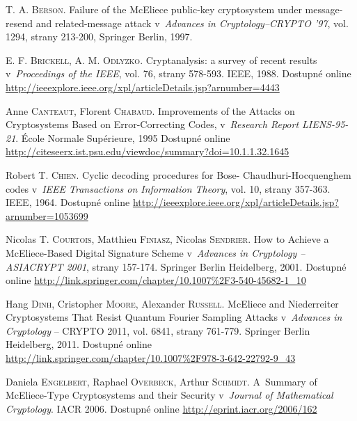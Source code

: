 \documentclass[thesis=M,czech,hidelinks]{FITthesis}[2012/06/26]
\newcommand{\0}{{\textcolor[gray]{0.75}{0}}}
\begin{document}
\begin{thebibliography}{99}
        T. A. \textsc{Berson}. Failure of the McEliece public-key cryptosystem under
        message-resend and related-message attack v~\emph{Advances in
        Cryptology–CRYPTO ’97}, vol. 1294, strany 213-200, Springer Berlin, 1997.

        E. F. \textsc{Brickell}, A. M. \textsc{Odlyzko}. Cryptanalysis: a survey
        of recent results v~\emph{Proceedings of the IEEE}, vol. 76, strany
        578-593. IEEE, 1988. Dostupné online
        \url{http://ieeexplore.ieee.org/xpl/articleDetails.jsp?arnumber=4443}

        Anne \textsc{Canteaut}, Florent \textsc{Chabaud}. Improvements of
        the Attacks on Cryptosystems Based on Error-Correcting Codes,
        v~\emph{Research Report LIENS-95-21}. École Normale Supérieure, 1995
        Dostupné online
        \url{http://citeseerx.ist.psu.edu/viewdoc/summary?doi=10.1.1.32.1645}

        Robert T. \textsc{Chien}. Cyclic decoding procedures for Bose-
        Chaudhuri-Hocquenghem codes v~\emph{IEEE Transactions on Information
        Theory}, vol. 10, strany 357-363. IEEE, 1964. Dostupné online
        \url{http://ieeexplore.ieee.org/xpl/articleDetails.jsp?arnumber=1053699}

        Nicolas T. \textsc{Courtois}, Matthieu \textsc{Finiasz}, Nicolas
        \textsc{Sendrier}. How to Achieve a McEliece-Based Digital Signature
        Scheme v~\emph{Advances in Cryptology -- ASIACRYPT 2001}, strany
        157-174. Springer Berlin Heidelberg, 2001. Dostupné online
        \url{http://link.springer.com/chapter/10.1007\%2F3-540-45682-1\_10}

        Hang \textsc{Dinh}, Cristopher \textsc{Moore}, Alexander
        \textsc{Russell}. McEliece and Niederreiter Cryptosystems That Resist
        Quantum Fourier Sampling Attacks v~\emph{Advances in Cryptology} --
        CRYPTO 2011, vol. 6841, strany 761-779. Springer Berlin Heidelberg,
        2011. Dostupné online
        \url{http://link.springer.com/chapter/10.1007\%2F978-3-642-22792-9\_43}

        Daniela \textsc{Engelbert}, Raphael \textsc{Overbeck}, Arthur
        \textsc{Schmidt}. A~Summary of McEliece-Type Cryptosystems and their
        Security v~\emph{Journal of Mathematical Cryptology}. IACR 2006.
        Dostupné online \url{http://eprint.iacr.org/2006/162}


\end{thebibliography}
\end{document}
